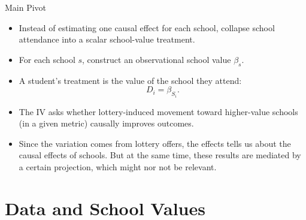\documentclass[notes,11pt,aspectratio=169]{beamer}
\newenvironment{wideitemize}{%
  \begin{minipage}{0.90\textwidth}
  \begin{itemize}
  \addtolength{\itemsep}{1em}
}{%
  \end{itemize}
  \end{minipage}
}
\begin{document}
\begin{frame}{Main Pivot}
\begin{wideitemize}
  \item Instead of estimating one causal effect for each school, collapse school attendance into a scalar school-value treatment.

  \item For each school \(s\), construct an observational school value \(\beta_s\).

  \item A student's treatment is the value of the school they attend:
  \[
    D_i = \beta_{S_i}.
  \]

  \item The IV asks whether lottery-induced movement toward higher-value schools (in a given metric) causally improves outcomes.
  \item Since the variation comes from lottery offers, the effects tells us about the causal effects of schools. But at the same time, these results are mediated by a certain projection, which might nor not be relevant. 
\end{wideitemize}
\end{frame}





\section{Data and School Values}
\end{document}
